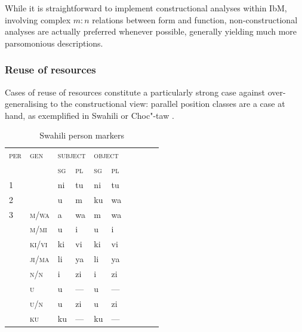 \documentclass[output=paper
                ,modfonts
                ,nonflat
	        ,collection
	        ,collectionchapter
	        ,collectiontoclongg
 	        ,biblatex
                ,babelshorthands
                ,newtxmath
                ,draftmode
                ,colorlinks, citecolor=brown
] {langscibook}
\begin{document}
{While it is straightforward to implement constructional analyses
within IbM, involving complex $m:n$ relations between form and
function, non-constructional analyses are actually preferred whenever
possible, generally yielding much more parsomonious descriptions.

\subsubsection{Reuse of resources}

Cases of reuse of resources constitute a particularly strong case
against over-generalising to the constructional view: parallel
position classes are a case at hand, as exemplified in Swahili
\citep{Stump93,Crysmann:Bonami:2016} or Choc"-taw \citep{broadwell:2017}. 

\begin{table}[hbt]
  \centering
  \small
  \begin{tabular}{llllllllll}
    \toprule
    \textsc{per} & \textsc{gen} & \multicolumn{2}{l}{\textsc{subject}} &
                                                                         \multicolumn{2}{l}{\textsc{object}}\\%
                 & & \textsc{sg} & \textsc{pl} & \textsc{sg} & \textsc{pl}\\%
    \midrule
    1	&       & ni & tu  & ni & tu\\%
    2	&       & u	 & m   & ku & wa\\%
    3	& \textsc{m/wa}  & a	 & wa  & m  & wa\\%
                 & \textsc{m/mi}	& u  & i   & u  & i \\%
                 & \textsc{ki/vi}	& ki & vi  & ki & vi \\%
                 & \textsc{ji/ma} & li & ya  & li & ya \\%
                 & \textsc{n/n} & i    & zi  & i  & zi \\%
                 & \textsc{u}     & u  & --- & u  & --- \\%
                 & \textsc{u/n}   & u  & zi  & u  & zi  \\%
                 & \textsc{ku}    & ku & --- & ku & --- \\%
    \bottomrule
\end{tabular}
  \caption{Swahili person markers \citep{Stump93}} \label{ex:SwaPer} 


\end{table}}
\end{document}
